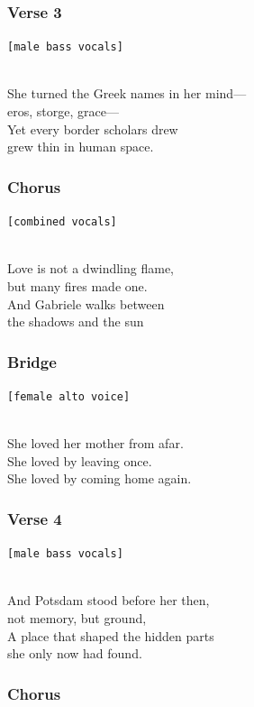 \subsubsection{Verse 3}\label{verse-3-4}

\texttt{{[}male\ bass\ vocals{]}}\strut \\
She turned the Greek names in her mind---\\
eros, storge, grace---\\
Yet every border scholars drew\\
grew thin in human space.

\subsubsection{Chorus}\label{chorus-21}

\texttt{{[}combined\ vocals{]}}\strut \\
Love is not a dwindling flame,\\
but many fires made one.\\
And Gabriele walks between\\
the shadows and the sun

\subsubsection{Bridge}\label{bridge-7}

\texttt{{[}female\ alto\ voice{]}}\strut \\
She loved her mother from afar.\\
She loved by leaving once.\\
She loved by coming home again.

\subsubsection{Verse 4}\label{verse-4-3}

\texttt{{[}male\ bass\ vocals{]}}\strut \\
And Potsdam stood before her then,\\
not memory, but ground,\\
A place that shaped the hidden parts\\
she only now had found.

\subsubsection{Chorus}\label{chorus-22}

